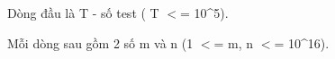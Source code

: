 Dòng đầu là T - số test ( T $<$= 10\textasciicircum5).

Mỗi dòng sau gồm 2 số m và n (1 $<$= m, n $<$= 10\textasciicircum16).